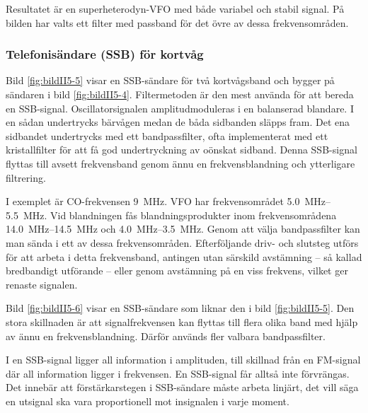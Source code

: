 Resultatet är en superheterodyn-VFO med både variabel och stabil
signal.
På bilden har valts ett filter med passband för det övre av dessa
frekvensområden.

\subsubsection{Telefonisändare (SSB) för kortvåg}


Bild \ref{fig:bildII5-5} visar en SSB-sändare för två kortvågsband och
bygger på sändaren i bild \ref{fig:bildII5-4}.
Filtermetoden är den mest använda för att bereda en SSB-signal.
Oscillatorsignalen amplitudmoduleras i en balanserad blandare.
I en sådan undertrycks bärvågen medan de båda sidbanden släpps fram.
Det ena sidbandet undertrycks med ett bandpassfilter, ofta implementerat med
ett kristallfilter för att få god undertryckning av oönskat sidband.
Denna SSB-signal flyttas till avsett frekvensband
genom ännu en frekvensblandning och ytterligare filtrering.

I exemplet är CO-frekvensen \SI{9}{\mega\hertz}.
VFO har frekvensområdet \SIrange{5,0}{5,5}{\mega\hertz}.
Vid blandningen fås blandningsprodukter inom frekvensområdena
\SIrange{14,0}{14,5}{\mega\hertz} och \SIrange{4,0}{3,5}{\mega\hertz}.
Genom att välja bandpassfilter kan man sända i ett av dessa frekvensområden.
Efterföljande driv- och slutsteg utförs för att arbeta i detta frekvensband,
antingen utan särskild avstämning -- så kallad bredbandigt utförande -- eller
genom avstämning på en viss frekvens, vilket ger renaste signalen.

Bild \ref{fig:bildII5-6} visar en SSB-sändare som liknar den i
bild \ref{fig:bildII5-5}.
Den stora skillnaden är att signalfrekvensen kan flyttas till flera olika band
med hjälp av ännu en frekvensblandning.
Därför används fler valbara bandpassfilter.


I en SSB-signal ligger all information i amplituden, till skillnad
från en FM-signal där all information ligger i frekvensen.
En SSB-signal får alltså inte förvrängas.
Det innebär att förstärkarstegen i SSB-sändare måste arbeta linjärt, det vill
säga en utsignal ska vara proportionell mot insignalen i varje moment.

